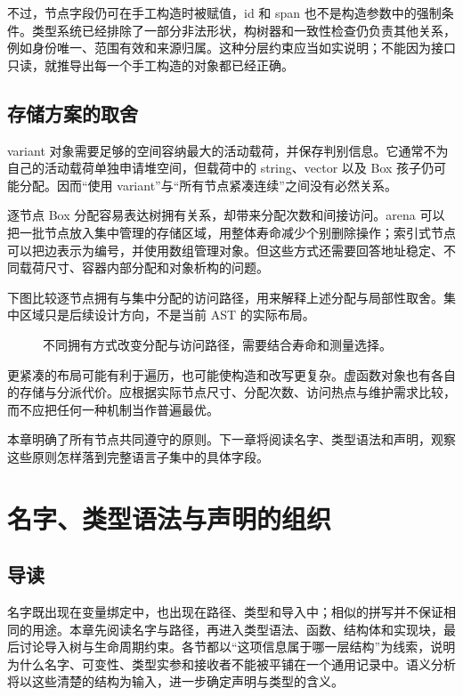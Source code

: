 不过，节点字段仍可在手工构造时被赋值，id 和 span 也不是构造参数中的强制条件。类型系统已经排除了一部分非法形状，构树器和一致性检查仍负责其他关系，例如身份唯一、范围有效和来源归属。这种分层约束应当如实说明；不能因为接口只读，就推导出每一个手工构造的对象都已经正确。

\section{存储方案的取舍}
variant 对象需要足够的空间容纳最大的活动载荷，并保存判别信息。它通常不为自己的活动载荷单独申请堆空间，但载荷中的 string、vector 以及 Box 孩子仍可能分配。因而“使用 variant”与“所有节点紧凑连续”之间没有必然关系。

逐节点 Box 分配容易表达树拥有关系，却带来分配次数和间接访问。arena 可以把一批节点放入集中管理的存储区域，用整体寿命减少个别删除操作；索引式节点可以把边表示为编号，并使用数组管理对象。但这些方式还需要回答地址稳定、不同载荷尺寸、容器内部分配和对象析构的问题。

下图比较逐节点拥有与集中分配的访问路径，用来解释上述分配与局部性取舍。集中区域只是后续设计方向，不是当前 AST 的实际布局。
\begin{figure}[htbp]
\centering
{}
\caption{不同拥有方式改变分配与访问路径，需要结合寿命和测量选择。}
\end{figure}
更紧凑的布局可能有利于遍历，也可能使构造和改写更复杂。虚函数对象也有各自的存储与分派代价。应根据实际节点尺寸、分配次数、访问热点与维护需求比较，而不应把任何一种机制当作普遍最优。

本章明确了所有节点共同遵守的原则。下一章将阅读名字、类型语法和声明，观察这些原则怎样落到完整语言子集中的具体字段。

\chapter{名字、类型语法与声明的组织}
\label{chap:front-declarations}

\section*{导读}
名字既出现在变量绑定中，也出现在路径、类型和导入中；相似的拼写并不保证相同的用途。本章先阅读名字与路径，再进入类型语法、函数、结构体和实现块，最后讨论导入树与生命周期约束。各节都以“这项信息属于哪一层结构”为线索，说明为什么名字、可变性、类型实参和接收者不能被平铺在一个通用记录中。语义分析将以这些清楚的结构为输入，进一步确定声明与类型的含义。

